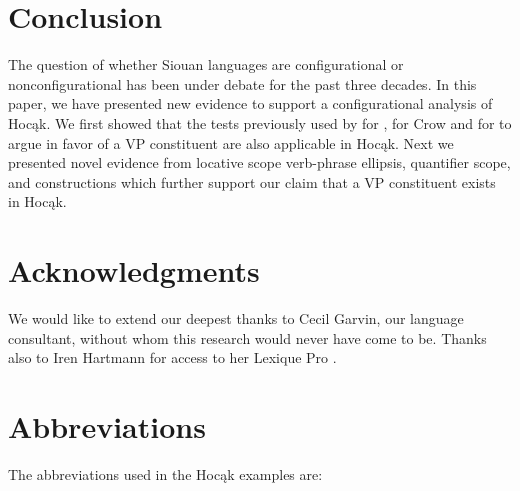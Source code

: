 \documentclass[output=paper]{LSP/langsci}
\begin{document}
\section{Conclusion}\label{sec:jrs:5}
 
The question of whether Siouan languages are configurational or nonconfigurational has been under debate for the past three decades. In this paper, we have presented new evidence to support a configurational analysis of Hocąk.  We first showed that the tests previously used by \citet{Boyle2007} for , \citet{Graczyk1991a} for Crow and \citet{West2003} for  to argue in favor of a VP constituent are also applicable in Hocąk.  Next we presented novel evidence from locative scope verb-phrase ellipsis, quantifier scope, and  constructions which further support our claim that a VP constituent exists in Hocąk. 
 

\section*{Acknowledgments}
We would like to extend our deepest thanks to Cecil Garvin, our language consultant, without whom this research would never have come to be. Thanks also to Iren Hartmann for access to her Lexique Pro .

\newpage
\section*{Abbreviations}
 
The abbreviations used in the Hocąk examples are: 
\end{document}
